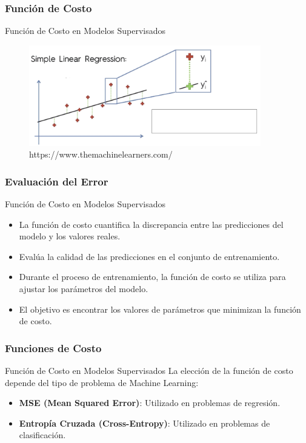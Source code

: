 \documentclass{beamer}
\begin{document}
\begin{frame}
	\frametitle{Función de Costo}
	\begin{block}{Función de Costo en Modelos Supervisados}	
		\begin{figure}
	\includegraphics[width=0.9\textwidth]{funcion_coste}
	\caption{https://www.themachinelearners.com/}
\end{figure}
	\end{block}
\end{frame}

\begin{frame}
	\frametitle{Evaluación del Error}
		\begin{block}{Función de Costo en Modelos Supervisados}	
	\begin{itemize}
		\item La función de costo cuantifica la discrepancia entre las predicciones del modelo y los valores reales.
		\item Evalúa la calidad de las predicciones en el conjunto de entrenamiento.
				\item Durante el proceso de entrenamiento, la función de costo se utiliza para ajustar los parámetros del modelo.
		\item El objetivo es encontrar los valores de parámetros que minimizan la función de costo.
	\end{itemize}
		\end{block}
\end{frame}




\begin{frame}
	\frametitle{Funciones de Costo}
			\begin{block}{Función de Costo en Modelos Supervisados}	
				La elección de la función de costo depende del tipo de problema de Machine Learning:
	\begin{itemize}
		\item \textbf{MSE (Mean Squared Error)}: Utilizado en problemas de regresión.
		\item \textbf{Entropía Cruzada (Cross-Entropy)}: Utilizado en problemas de clasificación.
	\end{itemize}
	\end{block}
\end{frame}
\end{document}
